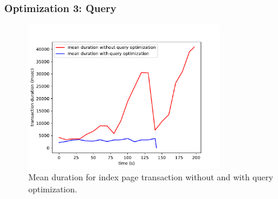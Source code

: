 \begin{frame}
\frametitle{Optimization 3: Query}
\begin{figure}
	\centering
	\includegraphics[width=0.75\textwidth]{images/list-pages-transaction-duration-without-query-with-query}
	\caption{Mean duration for index page transaction without and with query optimization.}\label{fig:sqlopt}

\end{figure}
\end{frame}
